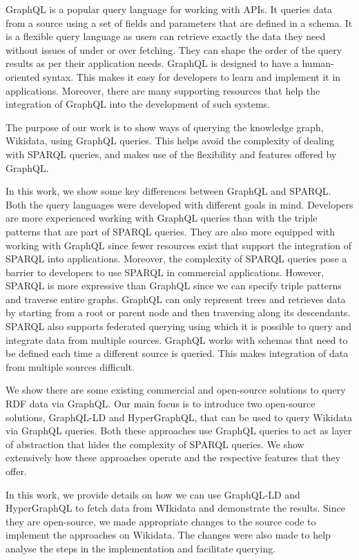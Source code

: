 \documentclass[12 pt, a4paper]{report}
\theoremstyle{definition}
\begin{document}
GraphQL is a popular query language for working with APIs. It queries data from a source using a set of fields and parameters that are defined in a schema. It is a flexible query language as users can retrieve exactly the data they need without issues of under or over fetching. They can shape the order of the query results as per their application needs. GraphQL is designed to have a human-oriented syntax. This makes it easy for developers to learn and implement it in applications. Moreover, there are many supporting resources that help the integration of GraphQL into the development of such systems.

The purpose of our work is to show ways of querying the knowledge graph, Wikidata, using GraphQL queries. This helps avoid the complexity of dealing with SPARQL queries, and makes use of the flexibility and features offered by GraphQL.

In this work, we show some key differences between GraphQL and SPARQL. Both the query languages were developed with different goals in mind. Developers are more experienced working with GraphQL queries than with the triple patterns that are part of SPARQL queries. They are also more equipped with working with GraphQL since fewer resources exist that support the integration of SPARQL into applications. Moreover, the complexity of SPARQL queries pose a barrier to developers to use SPARQL in commercial applications. However, SPARQL is more expressive than GraphQL since we can specify triple patterns and traverse entire graphs. GraphQL can only represent trees and retrieves data by starting from a root or parent node and then traversing along its descendants. SPARQL also supports federated querying using which it is possible to query and integrate data from multiple sources. GraphQL works with schemas that need to be defined each time a different source is queried. This makes integration of data from multiple sources difficult.

We show there are some existing commercial and open-source solutions to query RDF data via GraphQL. Our main focus is to introduce two open-source solutions, GraphQL-LD and HyperGraphQL, that can be used to query Wikidata via GraphQL queries. Both these approaches use GraphQL queries to act as layer of abstraction that hides the complexity of SPARQL queries. We show extensively how these approaches operate and the respective features that they offer. 

In this work, we provide details on how we can use GraphQL-LD and HyperGraphQL to fetch data from WIkidata and demonstrate the results. Since they are open-source, we made appropriate changes to the source code to implement the approaches on Wikidata. The changes were also made to help analyse the steps in the implementation and facilitate querying.
\end{document}
